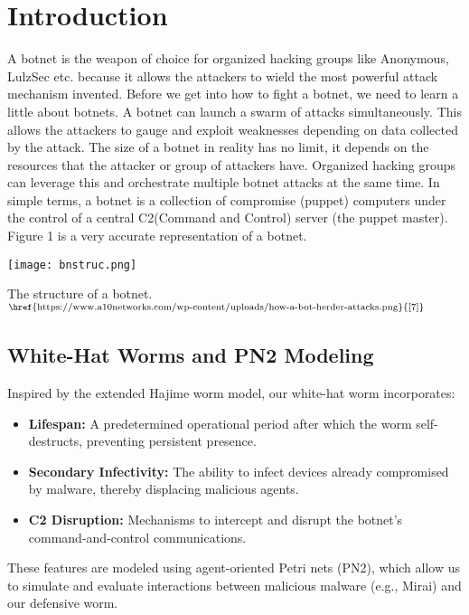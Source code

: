 \documentclass{article}
\begin{document}
\section{Introduction}
\noindent A botnet is the weapon of choice for organized hacking groups like Anonymous, LulzSec etc. because it allows the attackers to wield the most powerful attack mechanism invented. Before we get into how to fight a botnet, we need to learn a little about botnets. A botnet can launch a swarm of attacks simultaneously.  This allows the attackers to gauge and exploit weaknesses depending on data collected by the attack. The size of a botnet in reality has no limit, it depends on the resources that the attacker or group of attackers have. Organized hacking groups can leverage this and orchestrate multiple botnet attacks at the same time.
In simple terms, a botnet is a collection of compromise (puppet) computers under the control of a central C2(Command and Control) server (the puppet master). Figure 1 is a very accurate representation of a botnet.
\begin{tcolorbox}[
  colback=backcolour,            %
  colframe=blue!75!black,    %
  title={Botnet},
  fonttitle=\bfseries\large\centering,
  arc=4mm,                  %
  boxrule=1pt,              %
  left=10pt, right=10pt,    %
  top=10pt, bottom=10pt,    %
  enhanced
]
    \texttt{[image: bnstruc.png]}
    \begin{center}
    The structure of a botnet.$^{\text{\href{https://www.a10networks.com/wp-content/uploads/how-a-bot-herder-attacks.png}{[7]}}}$
    \end{center}
\end{tcolorbox}

\subsection{White-Hat Worms and PN2 Modeling}
Inspired by the extended Hajime worm model, our white-hat worm incorporates:
\begin{itemize}
    \item \textbf{Lifespan:} A predetermined operational period after which the worm self-destructs, preventing persistent presence.
    \item \textbf{Secondary Infectivity:} The ability to infect devices already compromised by malware, thereby displacing malicious agents.
    \item \textbf{C2 Disruption:} Mechanisms to intercept and disrupt the botnet's command-and-control communications.
\end{itemize}
These features are modeled using agent-oriented Petri nets (PN2), which allow us to simulate and evaluate interactions between malicious malware (e.g., Mirai) and our defensive worm.
\end{document}
